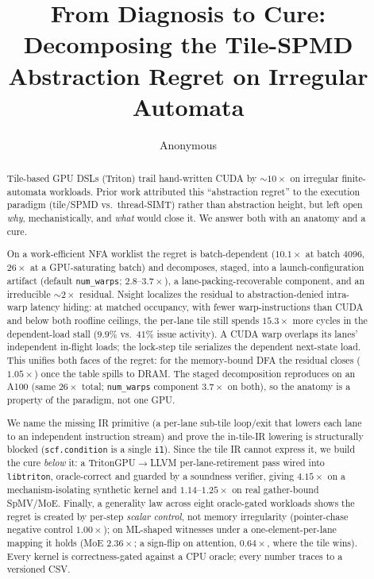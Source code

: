 \documentclass[manuscript,review,anonymous]{acmart}
\begin{document}
\title{From Diagnosis to Cure: Decomposing the Tile-SPMD Abstraction Regret on Irregular Automata}
\author{Anonymous}
\renewcommand{\shortauthors}{Anonymous}

\begin{abstract}
Tile-based GPU DSLs (Triton) trail hand-written CUDA by ${\sim}10\times$ on irregular finite-automata
workloads. Prior work attributed this ``abstraction regret'' to the execution paradigm (tile/SPMD vs.\
thread-SIMT) rather than abstraction height, but left open \emph{why}, mechanistically, and \emph{what}
would close it. We answer both with an anatomy and a cure.

On a work-efficient NFA worklist the regret is batch-dependent ($10.1\times$ at batch 4096, $26\times$
at a GPU-saturating batch) and decomposes, staged, into a launch-configuration artifact (default
\texttt{num\_warps}; $2.8$--$3.7\times$), a lane-packing-recoverable component, and an irreducible
${\sim}2\times$ residual. Nsight localizes the residual to abstraction-denied intra-warp latency
hiding: at matched occupancy, with fewer warp-instructions than CUDA and below both roofline ceilings,
the per-lane tile still spends $15.3\times$ more cycles in the dependent-load stall ($9.9\%$ vs.\ $41\%$
issue activity). A CUDA warp overlaps its lanes' independent in-flight loads; the lock-step tile
serializes the dependent next-state load. This unifies both faces of the regret: for the memory-bound
DFA the residual closes ($1.05\times$) once the table spills to DRAM. The staged decomposition
reproduces on an A100 (same $26\times$ total; \texttt{num\_warps} component $3.7\times$ on both), so the
anatomy is a property of the paradigm, not one GPU.

We name the missing IR primitive (a per-lane sub-tile loop/exit that lowers each lane to an independent
instruction stream) and prove the in-tile-IR lowering is structurally blocked (\texttt{scf.condition}
is a single \texttt{i1}). Since the tile IR cannot express it, we build the cure \emph{below} it: a
\mbox{TritonGPU$\rightarrow$LLVM} per-lane-retirement pass wired into \texttt{libtriton}, oracle-correct
and guarded by a soundness verifier, giving $4.15\times$ on a mechanism-isolating synthetic kernel and
$1.14$--$1.25\times$ on real gather-bound SpMV/MoE. Finally, a generality law across eight oracle-gated
workloads shows the regret is created by per-step \emph{scalar control}, not memory irregularity
(pointer-chase negative control $1.00\times$); on ML-shaped witnesses under a one-element-per-lane
mapping it holds (MoE $2.36\times$; a sign-flip on attention, $0.64\times$, where the tile wins).
Every kernel is correctness-gated against a CPU oracle; every number traces to a versioned CSV.
\end{abstract}
\end{document}
